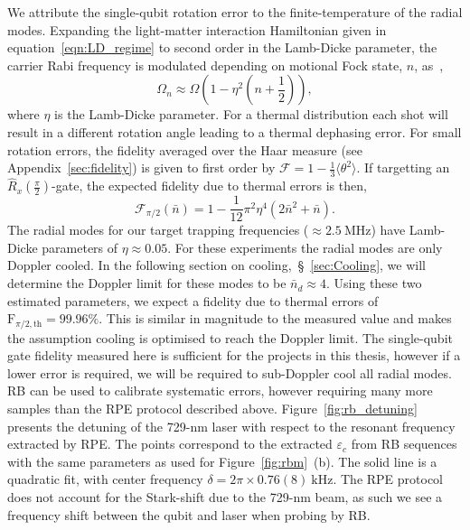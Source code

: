     We attribute the single-qubit rotation error to the finite-temperature of the radial modes. Expanding the light-matter interaction Hamiltonian given in equation~\ref{eqn:LD_regime} to second order in the Lamb-Dicke parameter, the carrier Rabi frequency is modulated depending on motional Fock state, $n$, as~\cite{leibfried_quantum_2003},
    \begin{equation}
    \Omega_n\approx \Omega\left(1-\eta^2\left(n+\frac{1}{2}\right)\right),
    \end{equation}
    where $\eta$ is the Lamb-Dicke parameter. For a thermal distribution each shot will result in a different rotation angle leading to a thermal dephasing error. For small rotation errors, the fidelity averaged over the Haar measure (see Appendix~\ref{sec:fidelity}) is given to first order by $\mathcal{F} =1-\frac{1}{3}\langle \theta^2\rangle$. If targetting an $\hat R_x(\frac{\pi}{2})$-gate, the expected fidelity due to thermal errors is then,
    \begin{equation}
        \mathcal{F}_{\pi/2}(\bar{n})=1-\frac{1}{12}\pi^2\eta^4 (2\bar{n}^2 + \bar{n}).
    \end{equation}
    The radial modes for our target trapping frequencies ($\approx 2.5~\unit{\mega\hertz}$) have Lamb-Dicke parameters of $\eta\approx0.05$. For these experiments the radial modes are only Doppler cooled. In the following section on cooling,~\S~\ref{sec:Cooling}, we will determine the Doppler limit for these modes to be $\bar{n}_d \approx 4$. Using these two estimated parameters, we expect a fidelity due to thermal errors of $\mathrm{F}_{\pi/2,\mathrm{th}}=99.96\%$. This is similar in magnitude to the measured value and makes the assumption cooling is optimised to reach the Doppler limit. The single-qubit gate fidelity measured here is sufficient for the projects in this thesis, however if a lower error is required, we will be required to sub-Doppler cool all radial modes. \\

    RB can be used to calibrate systematic errors, however requiring many more samples than the RPE protocol described above. Figure~\ref{fig:rb_detuning} presents the detuning of the 729-nm laser with respect to the resonant frequency extracted by RPE. The points correspond to the extracted $\varepsilon_c$ from RB sequences with the same parameters as used for Figure~\ref{fig:rbm}~(b). The solid line is a quadratic fit, with center frequency $\delta=2\pi\times 0.76(8)~\unit{\kilo\hertz}$. The RPE protocol does not account for the Stark-shift due to the 729-nm beam, as such we see a frequency shift between the qubit and laser when probing by RB.

